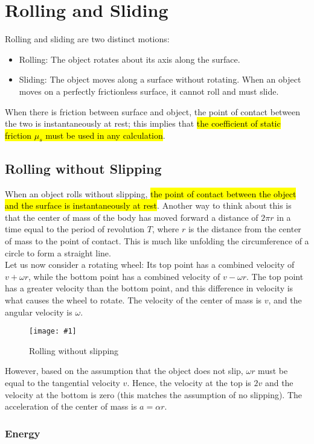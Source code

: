 \documentclass[a4paper,12pt]{article}
\let\oldsection\section
\renewcommand\section{\clearpage\oldsection}
\newcommand{\lb}{\\[8pt]}
\newcommand{\img}[4]{\begin{center}
  \begin{figure}[H]
    \centering
    \texttt{[image: \#1]}
    \caption{#3}
    \label{fig:#4}
  \end{figure}
\end{center}}
\begin{document}
\section{Rolling and Sliding}
Rolling and sliding are two distinct motions:
\begin{itemize}
  \item Rolling: The object rotates about its axis along the surface.
  \item Sliding: The object moves along a surface without rotating. When an object moves on a perfectly frictionless surface, it cannot roll and must slide.
\end{itemize}

When there is friction between surface and object, the point of contact between the two is instantaneously at rest; this implies that \hl{the coefficient of static friction $\mu_s$ must be used in any calculation}.

\subsection{Rolling without Slipping}

When an object rolls without slipping, \hl{the point of contact between the object and the surface is instantaneously at rest}. Another way to think about this is that the center of mass of the body has moved forward a distance of $2\pi r$ in a time equal to the period of revolution $T$, where $r$ is the distance from the center of mass to the point of contact. This is much like unfolding the circumference of a circle to form a straight line.\lb
Let us now consider a rotating wheel: Its top point has a combined velocity of $v + \omega r$, while the bottom point has a combined velocity of $v - \omega r$. The top point has a greater velocity than the bottom point, and this difference in velocity is what causes the wheel to rotate. The velocity of the center of mass is $v$, and the angular velocity is $\omega$.

\img{rolling.png}{0.8}{Rolling without slipping}{rolling}

However, based on the assumption that the object does not slip, $\omega r$ must be equal to the tangential velocity $v$. Hence, the velocity at the top is $2v$ and the velocity at the bottom is zero (this matches the assumption of no slipping). The acceleration of the center of mass is $a = \alpha r$.

\subsubsection{Energy}
\end{document}
